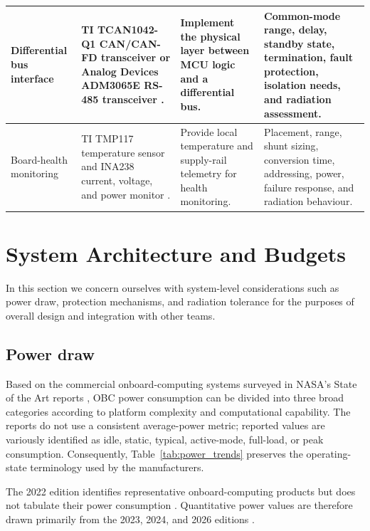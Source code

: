 \documentclass[10pt]{../datasheet}
\let\cite\citep
\begin{document}
\begin{longtable}{|p{3.0cm}|p{4.6cm}|p{4.8cm}|p{4.1cm}|}
  Differential bus interface                                                 &
  TI TCAN1042-Q1 CAN/CAN-FD transceiver \cite{ti_tcan1042} or Analog
  Devices ADM3065E RS-485 transceiver \cite{adi_adm3065e}.                   &
  Implement the physical layer between MCU logic and a differential bus.     &
  Common-mode range, delay, standby state, termination, fault protection,
  isolation needs, and radiation assessment.                                            \\ \hline

  Board-health monitoring                                                    &
  TI TMP117 temperature sensor and INA238 current, voltage, and power
  monitor \cite{ti_tmp117,ti_ina238}.                                        &
  Provide local temperature and supply-rail telemetry for health monitoring. &
  Placement, range, shunt sizing, conversion time, addressing, power,
  failure response, and radiation behaviour.                                            \\ \hline
\end{longtable}

\section{System Architecture and Budgets}

In this section we concern ourselves with system-level considerations such as power draw, protection mechanisms, and radiation tolerance for the purposes of overall design and integration with other teams.

\subsection{Power draw}
Based on the commercial onboard-computing systems surveyed in NASA's
State of the Art reports
\cite{nasa_soa_2022,nasa_soa_2023,nasa_soa_2024,nasa_soa_2026},
OBC power consumption can be divided into three broad categories according
to platform complexity and computational capability. The reports do not use
a consistent average-power metric; reported values are variously identified
as idle, static, typical, active-mode, full-load, or peak consumption.
Consequently, Table~\ref{tab:power_trends} preserves the operating-state
terminology used by the manufacturers.

The 2022 edition identifies representative onboard-computing products but
does not tabulate their power consumption
\cite[Table~8-1, pp.~214--217]{nasa_soa_2022}. Quantitative power values are
therefore drawn primarily from the 2023, 2024, and 2026 editions
\cite[Table~8-1, pp.~228--233]{nasa_soa_2023}
\cite[Table~8-1, pp.~230--236]{nasa_soa_2024}
\cite[Table~8-4, pp.~229--234]{nasa_soa_2026}.
\end{document}

